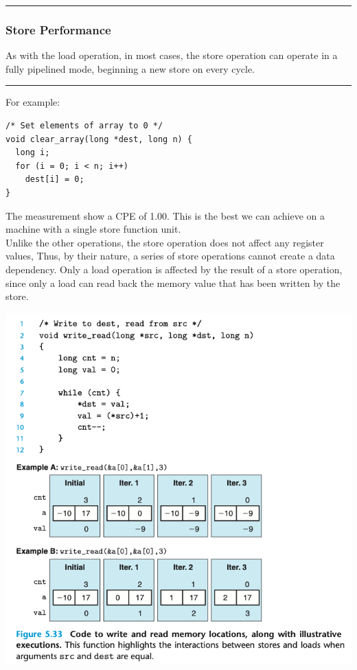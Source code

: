 \documentclass[11pt]{article}
\begin{document}
\noindent\rule{\textwidth}{0.5pt}


\subsubsection{Store Performance}
\label{sec:orgb019705}
As with the load operation, in most cases, the store operation can operate in a fully pipelined mode, beginning a new store on every cycle.\\

\noindent\rule{\textwidth}{0.5pt}
For example:\\
\begin{verbatim}
/* Set elements of array to 0 */
void clear_array(long *dest, long n) {
  long i;
  for (i = 0; i < n; i++)
    dest[i] = 0;
}

\end{verbatim}
The measurement show a CPE of 1.00. This is the best we can achieve on a machine with a single store function unit.\\

Unlike the other operations, the store operation does not affect any register values, Thus, by their nature, a series of store operations cannot create a data dependency. Only a load operation is affected by the result of a store operation, since only a load can read back the memory value that has been written by the store.\\


\begin{center}
\includegraphics[width=.9\linewidth]{pics/figure5.33-code-to-write-and-read-memory-locations.png}
\end{center}
\end{document}
